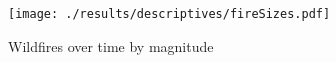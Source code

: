 \documentclass[11pt]{article}
\begin{document}
\begin{spacing}{1.3}



\begin{figure}
    \centering
    \texttt{[image: ./results/descriptives/fireSizes.pdf]}
    \caption{Wildfires over time by magnitude}
    \label{fig:firesize}
\end{figure}








\end{spacing}
\end{document}

